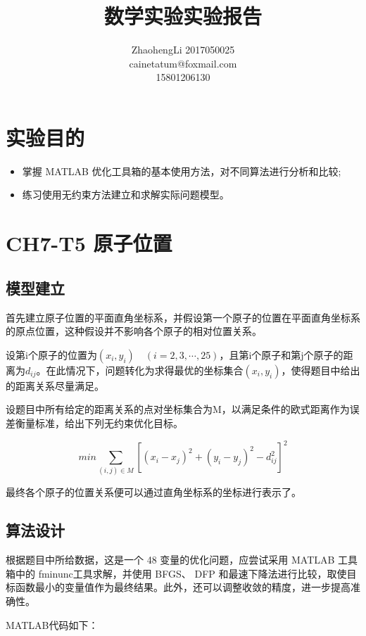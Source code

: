 \documentclass{article}
\title{数学实验实验报告}
\author{ZhaohengLi 2017050025\\cainetatum@foxmail.com\\15801206130}
\begin{document}
\maketitle
\section{实验目的}
\begin{itemize}
	\item{掌握 MATLAB 优化工具箱的基本使用方法，对不同算法进行分析和比较;}
	\item{练习使用无约束方法建立和求解实际问题模型。}
\end{itemize}


\section{CH7-T5 原子位置}

\subsection{模型建立}
首先建立原子位置的平面直角坐标系，并假设第一个原子的位置在平面直角坐标系的原点位置，这种假设并不影响各个原子的相对位置关系。

设第i个原子的位置为$(x_i,y_i)\quad (i=2,3,\cdots,25)$，且第i个原子和第j个原子的距离为$d_{ij}$。在此情况下，问题转化为求得最优的坐标集合$(x_i,y_i)$，使得题目中给出的距离关系尽量满足。

设题目中所有给定的距离关系的点对坐标集合为M，以满足条件的欧式距离作为误差衡量标准，给出下列无约束优化目标。

$$min\sum_{(i,j)\in M}[(x_i-x_j)^2+(y_i-y_j)^2-d_{ij}^2]^2$$

最终各个原子的位置关系便可以通过直角坐标系的坐标进行表示了。

\subsection{算法设计}
根据题目中所给数据，这是一个 48 变量的优化问题，应尝试采用 MATLAB 工具箱中的 fminunc工具求解，并使用 BFGS、 DFP 和最速下降法进行比较，取使目标函数最小的变量值作为最终结果。此外，还可以调整收敛的精度，进一步提高准确性。

MATLAB代码如下：
\end{document}
